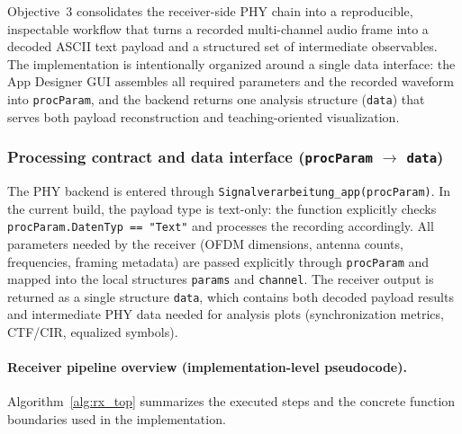 Objective~3 consolidates the receiver-side PHY chain into a reproducible, inspectable workflow that turns a recorded multi-channel audio frame into a decoded ASCII text payload and a structured set of intermediate observables. The implementation is intentionally organized around a single data interface: the App Designer GUI assembles all required parameters and the recorded waveform into \texttt{procParam}, and the backend returns one analysis structure (\texttt{data}) that serves both payload reconstruction and teaching-oriented visualization.

\subsubsection{Processing contract and data interface (\texorpdfstring{\texttt{procParam} $\rightarrow$ \texttt{data}}{procParam -> data})}
\label{sec:phy_contract_final}

The PHY backend is entered through \texttt{Signalverarbeitung\_app(procParam)}. In the current build, the payload type is text-only: the function explicitly checks \texttt{procParam.DatenTyp == "Text"} and processes the recording accordingly. All parameters needed by the receiver (OFDM dimensions, antenna counts, frequencies, framing metadata) are passed explicitly through \texttt{procParam} and mapped into the local structures \texttt{params} and \texttt{channel}. The receiver output is returned as a single structure \texttt{data}, which contains both decoded payload results and intermediate PHY data needed for analysis plots (synchronization metrics, CTF/CIR, equalized symbols).

\paragraph{Receiver pipeline overview (implementation-level pseudocode).}
Algorithm~\ref{alg:rx_top} summarizes the executed steps and the concrete function boundaries used in the implementation.

